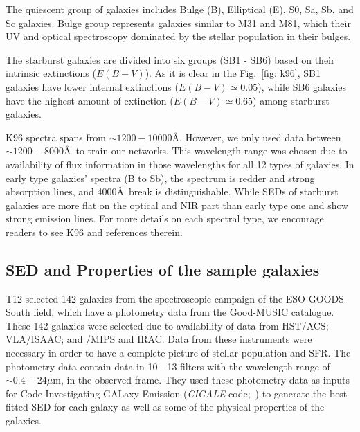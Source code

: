 
    The quiescent group of galaxies includes Bulge (B), Elliptical (E), S0, Sa, Sb, and Sc galaxies.
    Bulge group represents galaxies similar to M31 and M81, which their UV and optical spectroscopy dominated by the stellar population in their bulges.
    
    The starburst galaxies are divided into six groups (SB1 - SB6) based on their intrinsic extinctions ($E(B-V)$). 
    As it is clear in the Fig.~\ref{fig: k96}, SB1 galaxies have lower internal extinctions ($E(B-V) \simeq 0.05$), while SB6 galaxies have the highest amount of extinction ($E(B-V) \simeq 0.65$) among starburst galaxies. %
    
    K96 spectra spans from $\sim1200-10000$\AA.
    However, we only used data between $\sim1200-8000$\AA~to train our networks. 
    This wavelength range was chosen due to availability of flux information in those wavelengths for all 12 types of galaxies.
    In early type galaxies' spectra (B to Sb), the spectrum is redder and strong absorption lines, and 4000\AA~break is distinguishable. 
    While SEDs of starburst galaxies are more flat on the optical and NIR part than early type one and show strong emission lines.
    For more details on each spectral type, we encourage readers to see K96 and references therein. 
    

 \subsection{SED and Properties of the sample galaxies} 
    T12 selected 142 galaxies from the spectroscopic campaign of the ESO GOODS-South field, which have a photometry data from the Good-MUSIC catalogue.
    These 142 galaxies were selected due to availability of data from HST/ACS; VLA/ISAAC; and \Spitzer/MIPS and IRAC. 
    Data from these instruments were necessary in order to have a complete picture of stellar population and SFR.
    The photometry data contain data in 10 - 13 filters with the wavelength range of $\sim 0.4-24 \mu$m, in the observed frame. %
    They used these photometry data as inputs for Code Investigating GALaxy Emission ({\em CIGALE} code;~\citep[][hereafter N09]{Noll09}) to generate the best fitted SED for each galaxy as well as some of the physical properties of the galaxies.
    
